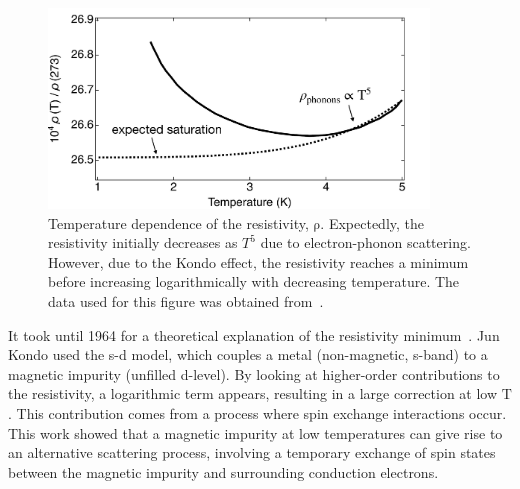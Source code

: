 \begin{figure}[!hbt]
 \begin{center}
\includegraphics[width=0.9\textwidth]{figures/ch2/figure9.pdf}
\caption[Kondo Effect in Bulk Materials]{\label{fig:ch2/kondo_bulkmetal} 
Temperature dependence of the resistivity, $\mathrm{\rho}$. Expectedly, the resistivity initially decreases as $T^5$ due to electron-phonon scattering. However, due to the Kondo effect, the resistivity reaches a minimum before increasing logarithmically with decreasing temperature. The data used for this figure was obtained from~\cite{de_haas}.
 }
 \end{center}
\end{figure}




It took until 1964 for a theoretical explanation of the resistivity minimum~\cite{jun_kondo}. Jun Kondo used the s-d model, which couples a metal (non-magnetic, s-band) to a magnetic impurity (unfilled d-level). By looking at higher-order contributions to the resistivity, a logarithmic term appears, resulting in a large correction at low $\mathrm{T}$. This contribution comes from a process where spin exchange interactions occur. This work showed that a magnetic impurity at low temperatures can give rise to an alternative scattering process, involving a temporary exchange of spin states between the magnetic impurity and surrounding conduction electrons. 


